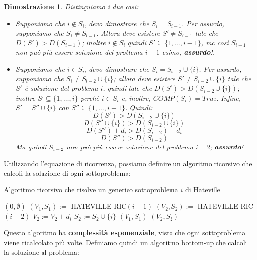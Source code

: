 \documentclass[12pt]{article}
\newtheorem{Dimostrazione}{Dimostrazione}[subsection]
\begin{document}
\begin{Dimostrazione}
    Distinguiamo i due casi:
    \begin{itemize}
        \item Supponiamo che $i \notin S_i$, devo dimostrare che $S_i = S_{i-1}$. Per assurdo, supponiamo che $S_i \neq S_{i-1}$.
        Allora deve esistere $S' \neq S_{i-1}$ tale che $D(S') > D(S_{i-1})$; inoltre $i \notin S_i$ quindi $S' \subseteq \{1,\dots,i-1\}$, ma così $S_{i-1}$ non
        può più essere soluzione del problema $i-1$-esimo, \textbf{assurdo}!.
        \item Supponiamo che $i \in S_i$, devo dimostrare che $S_i = S_{i-2} \cup \{i\}$. Per assurdo, supponiamo che $S_i \neq S_{i-2} \cup \{i\}$; allora deve esistere $S' \neq S_{i-2} \cup \{i\}$ tale che
        $S'$ è soluzione del problema $i$, quindi tale che $D(S') > D(S_{i-2} \cup \{i\})$; inoltre $S' \subseteq\{1,\dots,i\}$ perché $i \in S_i$ e, inoltre, $COMP(S_i) = True$.
        Infine, $S' = S'' \cup \{i\}$ con $S'' \subseteq\{1,\dots, i-1\}$.
        Quindi:
        $$D(S') > D(S_{i-2} \cup \{i\})$$
        $$D(S'' \cup \{i\}) > D(S_{i-2} \cup \{i\})$$
        $$D(S'') + d_i > D(S_{i-2}) + d_i$$
        $$D(S'') > D(S_{i-2})$$
        Ma quindi $S_{i-2}$ non può più essere soluzione del problema $i-2$; \textbf{assurdo}!.
    \end{itemize}
\end{Dimostrazione}
Utilizzando l'equazione di ricorrenza, possiamo definire un algoritmo ricorsivo che calcoli la soluzione di ogni sottoproblema: \newline
\begin{algorithm}[H]
    \caption{Algoritmo ricorsivo che risolve un generico sottoproblema $i$ di Hateville}
    \DontPrintSemicolon
     {
         {
            \Return $(0, \emptyset)$
        } {
            $(V_1, S_1) :=$ HATEVILLE-RIC$(i-1)$ \;
            $(V_2, S_2) :=$ HATEVILLE-RIC$(i-2)$ \;
            $V_2 := V_2 + d_i$ \;
            $S_2 := S_2 \cup \{i\}$ \;
             {
                \Return $(V_1, S_1)$
            } {
                \Return $(V_2, S_2)$
            }
        }
    }
\end{algorithm} \noindent
\newpage \noindent
Questo algoritmo ha \textbf{complessità esponenziale}, visto che ogni sottoproblema viene ricalcolato più volte. Definiamo
quindi un algoritmo bottom-up che calcoli la soluzione al problema: \newline
\end{document}
